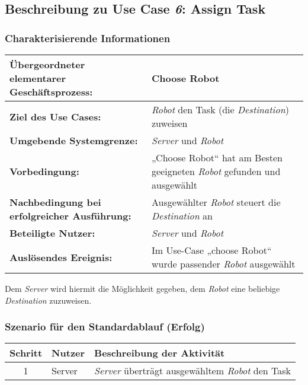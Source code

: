 			
		\pagebreak

		\subsection{Beschreibung zu Use Case \emph{6}: Assign Task}

			\subsubsection*{Charakterisierende Informationen}

			\begin{table}[H]
				\centering
				\begin{tabularx}{\textwidth}{@{}p{5cm}X@{}}
				\hline
				\textbf{Übergeordneter elementarer Geschäftsprozess:} & Choose Robot  \\ \hline
				\textbf{Ziel des Use Cases:} & \emph{Robot} den Task (die \emph{Destination}) zuweisen\\ \hline
				\textbf{Umgebende Systemgrenze:} & \emph{Server} und \emph{Robot} \\ \hline
				\textbf{Vorbedingung:} & „Choose Robot“ hat am Besten geeigneten \emph{Robot} gefunden und ausgewählt\\ \hline
				\textbf{Nachbedingung bei erfolgreicher Ausführung:} & Ausgewählter \emph{Robot} steuert die \emph{Destination} an\\ \hline
				\textbf{Beteiligte Nutzer:} & \emph{Server} und \emph{Robot}\\ \hline
				\textbf{Auslösendes Ereignis:} & Im Use-Case „choose Robot“ wurde passender \emph{Robot} ausgewählt\\
				\hline
				\end{tabularx}
			\end{table}
			
			Dem \emph{Server} wird hiermit die Möglichkeit gegeben, dem \emph{Robot} eine beliebige \emph{Destination} zuzuweisen. 

			\subsubsection*{Szenario für den Standardablauf (Erfolg)}

			\begin{table}[H]
				\centering
				\begin{tabularx}{\textwidth}{@{}cp{2cm}X@{}}
				\hline
				Schritt & Nutzer & Beschreibung der Aktivität \\ \hline
				1 & Server & \emph{Server} überträgt ausgewähltem \emph{Robot} den Task \\
				\hline
				\end{tabularx}
			\end{table}

